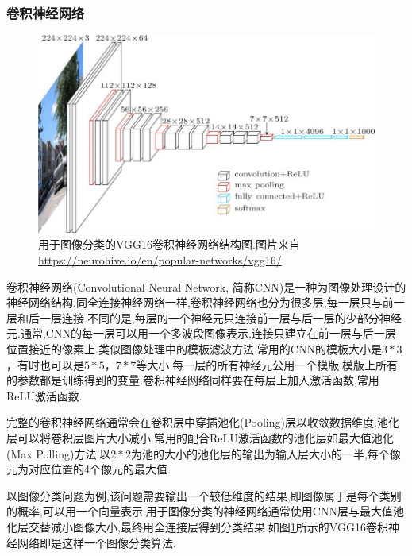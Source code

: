 \subsubsection{卷积神经网络}
\par
\begin{figure}[htbp!]
    \centering
    \includegraphics[width = 1.\textwidth]{chap/img/vgg16-neural-network.jpg}
    \caption{
        用于图像分类的VGG16\supercite{simonyan2014very}卷积神经网络结构图.图片来自 \url{https://neurohive.io/en/popular-networks/vgg16/}
        }\label{fig:vgg16_architecture}
\end{figure}
\par
卷积神经网络(Convolutional Neural Network, 简称CNN)是一种为图像处理设计的神经网络结构.同全连接神经网络一样,卷积神经网络也分为很多层,每一层只与前一层和后一层连接.不同的是,每层的一个神经元只连接前一层与后一层的少部分神经元.通常,CNN的每一层可以用一个多波段图像表示,连接只建立在前一层与后一层位置接近的像素上.类似图像处理中的模板滤波方法.常用的CNN的模板大小是$3*3$，有时也可以是$5*5$，$7*7$等大小.每一层的所有神经元公用一个模版,模版上所有的参数都是训练得到的变量.卷积神经网络同样要在每层上加入激活函数,常用ReLU激活函数.
\par
完整的卷积神经网络通常会在卷积层中穿插池化(Pooling)层以收敛数据维度.池化层可以将卷积层图片大小减小.常用的配合ReLU激活函数的池化层如最大值池化(Max Polling)方法.以$2*2$为池的大小的池化层的输出为输入层大小的一半,每个像元为对应位置的4个像元的最大值.
\par
以图像分类问题为例,该问题需要输出一个较低维度的结果,即图像属于是每个类别的概率,可以用一个向量表示.用于图像分类的神经网络通常使用CNN层与最大值池化层交替减小图像大小,最终用全连接层得到分类结果.如图\ref{fig:vgg16_architecture}所示的VGG16\supercite{simonyan2014very}卷积神经网络即是这样一个图像分类算法.
\par
